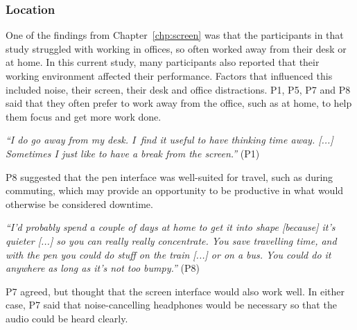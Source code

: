 


\subsubsection{Location}

One of the findings from Chapter~\ref{chp:screen} was that the participants in that study struggled with working in
offices, so often worked away from their desk or at home. In this current study, many participants also reported that
their working environment affected their performance. Factors that influenced this included noise, their screen, their
desk and office distractions. P1, P5, P7 and P8 said that they often prefer to work away from the office, such as at
home, to help them focus and get more work done.

\textit{``I do go away from my desk. I find it useful to have thinking time away. [...] Sometimes I just like to have a
break from the screen.''} (P1)

P8 suggested that the pen interface was well-suited for travel, such as during commuting, which may provide an
opportunity to be productive in what would otherwise be considered downtime.

\textit{``I'd probably spend a couple of days at home to get it into shape [because] it's quieter [...]
  so you can really really concentrate. You save travelling time, and with the pen you could do stuff on the train [...]
  or on a bus. You could do it anywhere as long as it's not too bumpy.''} (P8)

P7 agreed, but thought that the screen interface would also work well. In either case, P7 said that noise-cancelling
headphones would be necessary so that the audio could be heard clearly.

